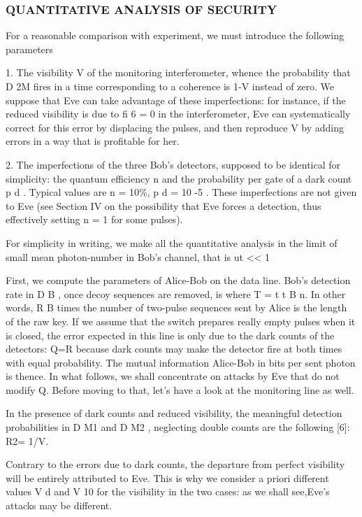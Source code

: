 \subsubsection{QUANTITATIVE ANALYSIS OF SECURITY}

For a reasonable comparison with experiment, we must introduce the following parameters

1. The visibility V of the monitoring interferometer, whence the probability that D 2M fires in a time corresponding to a coherence is 1-V instead of zero. We suppose that Eve can take advantage of these imperfections: for instance, if the reduced visibility is due to fi 6 = 0 in the interferometer, Eve can systematically correct for this error by displacing the pulses, and then reproduce V by adding errors in a way that is profitable for her.

2. The imperfections of the three Bob’s detectors, supposed to be identical for simplicity: the quantum efficiency n and the probability per gate of a dark count p d . Typical values are n = 10\%, p d = 10 -5 . These imperfections are not given to Eve (see Section IV on the possibility that Eve forces a detection, thus effectively setting n = 1 for some pulses).

For simplicity in writing, we make all the quantitative analysis in the limit of small mean photon-number in Bob’s channel, that is ut << 1

First, we compute the parameters of Alice-Bob on the data line. Bob’s detection rate in D B , once decoy sequences are removed, is where T = t t B n. In other words, R B times the number of two-pulse sequences sent by Alice is the length of the raw key.
If we assume that the switch prepares really empty pulses when it is closed, the error expected in this line is only due to the dark counts of the detectors: Q=R because dark counts may make the detector fire at both times with equal probability. The mutual information Alice-Bob in bits per sent photon is thence. In what follows, we shall concentrate on attacks by Eve that do not modify Q. Before moving to that, let’s have a look at the monitoring line as well.

In the presence of dark counts and reduced visibility, the meaningful detection probabilities in D M1 and D M2 , neglecting double counts are the following [6]: R2= 1/V.

Contrary to the errors due to dark counts, the departure from perfect visibility will be entirely attributed to Eve. This is why we consider a priori different values V d and V 10 for the visibility in the two cases: as we shall see,Eve’s attacks may be different.

